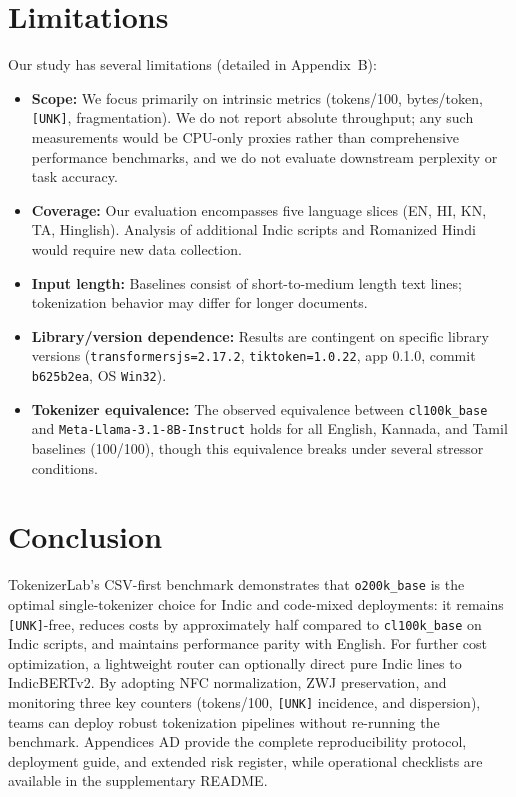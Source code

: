 \documentclass{article}
\begin{document}

\section{Limitations}

Our study has several limitations (detailed in Appendix~B):

\begin{itemize}
    \item \textbf{Scope:} We focus primarily on intrinsic metrics (tokens/100, bytes/token, \texttt{[UNK]}, fragmentation). We do not report absolute throughput; any such measurements would be CPU-only proxies rather than comprehensive performance benchmarks, and we do not evaluate downstream perplexity or task accuracy.
    
    \item \textbf{Coverage:} Our evaluation encompasses five language slices (EN, HI, KN, TA, Hinglish). Analysis of additional Indic scripts and Romanized Hindi would require new data collection.
    
    \item \textbf{Input length:} Baselines consist of short-to-medium length text lines; tokenization behavior may differ for longer documents.
    
    \item \textbf{Library/version dependence:} Results are contingent on specific library versions (\texttt{transformersjs=2.17.2}, \texttt{tiktoken=1.0.22}, app 0.1.0, commit \texttt{b625b2ea}, OS \texttt{Win32}).
    
    \item \textbf{Tokenizer equivalence:} The observed equivalence between \texttt{cl100k\_base} and \texttt{Meta{-}Llama-3.1{-}8B{-}Instruct} holds for all English, Kannada, and Tamil baselines (100/100), though this equivalence breaks under several stressor conditions.
\end{itemize}



\section{Conclusion}
TokenizerLab's CSV-first benchmark demonstrates that \texttt{o200k\_base} is the optimal single-tokenizer choice for Indic and code-mixed deployments: it remains \texttt{[UNK]}-free, reduces costs by approximately half compared to \texttt{cl100k\_base} on Indic scripts, and maintains performance parity with English. For further cost optimization, a lightweight router can optionally direct pure Indic lines to IndicBERTv2. By adopting NFC normalization, ZWJ preservation, and monitoring three key counters (tokens/100, \texttt{[UNK]} incidence, and dispersion), teams can deploy robust tokenization pipelines without re-running the benchmark. Appendices A\textendash{}D provide the complete reproducibility protocol, deployment guide, and extended risk register, while operational checklists are available in the supplementary README.\@
\end{document}

